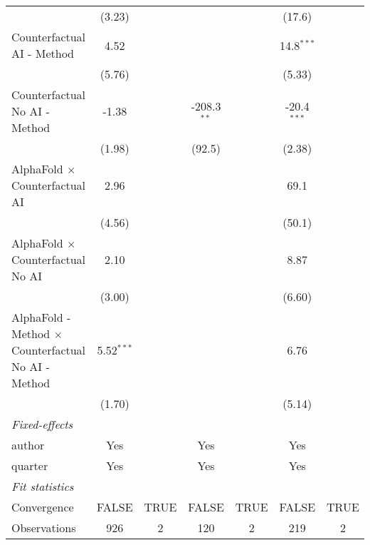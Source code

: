 \begin{tabular}{lcccccc}
                                                              & (3.23)        &      &               &      & (17.6)        &   \\   
   Counterfactual AI - Method                                 & 4.52          &      &               &      & 14.8$^{***}$  &   \\   
                                                              & (5.76)        &      &               &      & (5.33)        &   \\   
   Counterfactual No AI - Method                              & -1.38         &      & -208.3$^{**}$ &      & -20.4$^{***}$ &   \\   
                                                              & (1.98)        &      & (92.5)        &      & (2.38)        &   \\   
   AlphaFold $\times$ Counterfactual AI                       & 2.96          &      &               &      & 69.1          &   \\   
                                                              & (4.56)        &      &               &      & (50.1)        &   \\   
   AlphaFold $\times$ Counterfactual No AI                    & 2.10          &      &               &      & 8.87          &   \\   
                                                              & (3.00)        &      &               &      & (6.60)        &   \\   
   AlphaFold - Method $\times$ Counterfactual No AI - Method  & 5.52$^{***}$  &      &               &      & 6.76          &   \\   
                                                              & (1.70)        &      &               &      & (5.14)        &   \\   
   \midrule
   \emph{Fixed-effects}\\
   author                                                     & Yes           &      & Yes           &      & Yes           & \\  
   quarter                                                    & Yes           &      & Yes           &      & Yes           & \\  
   \midrule
   \emph{Fit statistics}\\
   Convergence                                                &FALSE          & TRUE & FALSE         & TRUE & FALSE         & TRUE\\  
   Observations                                               & 926           & 2    & 120           & 2    & 219           & 2\\  

\end{tabular}

